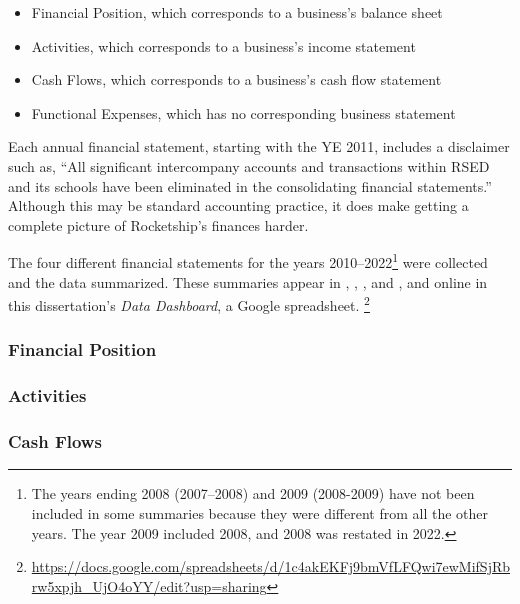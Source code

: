 \begin{itemize}
  \item Financial Position, which corresponds to a business's balance sheet\\
  \item Activities, which corresponds to a business's income statement\\
  \item Cash Flows, which corresponds to a business's cash flow statement\\
  \item Functional Expenses, which has no corresponding business statement\\
\end{itemize}

Each annual financial statement, starting with the YE 2011, includes a disclaimer such as, ``All significant intercompany accounts and transactions within RSED and its schools have been eliminated in the consolidating financial statements.'' Although this may be standard accounting practice, it does make getting a complete picture of Rocketship's finances harder.

The four different financial statements for the years 2010–2022\footnote{The years ending 2008 (2007–2008) and 2009 (2008-2009) have not been included in some summaries because they were different from all the other years. The year 2009 included 2008, and 2008 was restated in 2022.} were collected and the data summarized. These summaries appear in , , , and , and online in this dissertation's \textit{Data Dashboard}, a Google spreadsheet.%
\footnote{\url{https://docs.google.com/spreadsheets/d/1c4akEKFj9bmVfLFQwi7ewMifSjRbrw5xpjh_UjO4oYY/edit?usp=sharing}}

\subsubsection{Financial Position}\indent%
\label{sec:financial_position}

\subsubsection{Activities}\indent%
\label{sec:activities}

\subsubsection{Cash Flows}\indent%
\label{sec:cash_flows}


